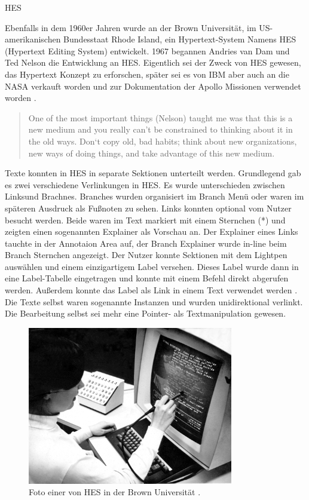 \begin{section}{HES}
\label{sec:hes}

Ebenfalls in dem 1960er Jahren wurde an der Brown Universität, im US-amerikanischen Bundesstaat Rhode Island, ein Hypertext-System Namens \glqq HES\grqq{ } (Hypertext Editing System) entwickelt. 1967 begannen Andries van Dam und Ted Nelson die Entwicklung an HES. Eigentlich sei der Zweck von HES gewesen, das Hypertext Konzept zu erforschen, später sei es von IBM aber auch an die NASA verkauft worden und zur Dokumentation der Apollo Missionen verwendet worden \cite{Dam1988}.

\begin{quote}
\glqq One of the most important things (Nelson) taught me was that this is a new medium and you really can’t be constrained to thinking about it in the old ways. Don‘t copy old, bad habits; think about new organizations, new ways of doing things, and take advantage of this new medium.\grqq{ }\cite{Dam1988}
\end{quote}

Texte konnten in HES in separate Sektionen unterteilt werden. Grundlegend gab es zwei verschiedene Verlinkungen in HES. Es wurde unterschieden zwischen \glqq Links\grqq{ }und \glqq Brachnes\grqq{ }. Branches wurden organisiert im Branch Menü oder waren im späteren Ausdruck als Fußnoten zu sehen. Links konnten optional vom Nutzer besucht werden. Beide waren im Text markiert mit einem Sternchen (*) und zeigten einen sogenannten Explainer als Vorschau an. Der Explainer eines Links tauchte in der Annotaion Area auf, der Branch Explainer wurde in-line beim Branch Sternchen angezeigt. Der Nutzer konnte Sektionen mit dem Lightpen auswählen und einem einzigartigem Label versehen. Dieses Label wurde dann in eine Label-Tabelle eingetragen und konnte mit einem Befehl direkt abgerufen werden. Außerdem konnte das Label als Link in einem Text verwendet werden \cite{Dam1969}. Die Texte selbst waren sogenannte Instanzen und wurden unidirektional verlinkt. \glqq Die Bearbeitung selbst sei mehr eine Pointer- als Textmanipulation gewesen\grqq{ }\cite[S. 890]{Dam1988}.

\begin{figure}[H]
	\centering
	\includegraphics[width=0.8\textwidth]{image/hes}
	\caption{Foto einer von HES in der Brown Universität \cite{Lloyd1969}.}
	\label{fig:hes}
\end{figure}


\end{section}

